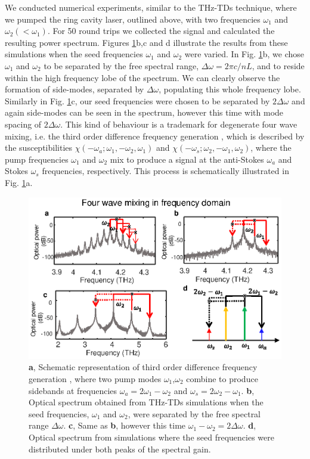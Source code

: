 \documentclass[10pt,letterpaper]{article}
\begin{document}
{We conducted numerical experiments, similar to the THz-TDs technique, where we pumped the ring cavity laser, outlined above, with two frequencies $\omega_1$ and $\omega_2 (< \omega_1)$. For 50 round trips we collected the signal and calculated the resulting power spectrum. Figures \ref{fig:img04}b,c and d illustrate the results from these simulations when the seed frequencies $\omega_1$ and $\omega_2$ were varied. In Fig. \ref{fig:img04}b, we chose $\omega_1$ and $\omega_2$ to be separated by the free spectral range, $\Delta\omega = 2\pi c/nL$, and to reside within the high frequency lobe of the spectrum. We can clearly observe the formation of side-modes, separated by $\Delta \omega$, populating this whole frequency lobe. Similarly in Fig. \ref{fig:img04}c, our seed frequencies were chosen to be separated by $2\Delta \omega$ and again side-modes can be seen in the spectrum, however this time with mode spacing of $2\Delta \omega$. This kind of behaviour is a trademark for degenerate four wave mixing, i.e. the third order difference frequency generation \cite{butcher1991elements}, which is described by the susceptibilities $\chi(-\omega_a; \omega_1,-\omega_2,\omega_1)$  and $\chi(-\omega_s; \omega_2,-\omega_1,\omega_2)$, where the pump frequencies $\omega_1$ and $\omega_2$ mix to produce a signal at the anti-Stokes $\omega_a$ and Stokes $\omega_s$ frequencies, respectively. This process is schematically illustrated in Fig. \ref{fig:img04}a.

\begin{figure}[h!]
	\begin{center}
		\includegraphics[scale=0.8]{figs/FWM.eps}
		\caption{\textbf{a}, Schematic representation of third order difference frequency generation \cite{butcher1991elements}, where two pump modes $\omega_1$,$\omega_2$ combine to produce sidebands at frequencies $\omega_a = 2\omega_1-\omega_2$ and $\omega_s=2\omega_2-\omega_1$. \textbf{b}, Optical spectrum obtained from THz-TDs simulations when the seed frequencies, $\omega_1$ and $\omega_2$, were separated by the free spectral range $\Delta \omega$. \textbf{c}, Same as \textbf{b}, however this time $\omega_1-\omega_2 = 2\Delta \omega$. \textbf{d}, Optical spectrum from simulations where the seed frequencies were distributed under both peaks of the spectral gain.} \label{fig:img04} 
	\end{center}	
\end{figure}

}
\end{document}
